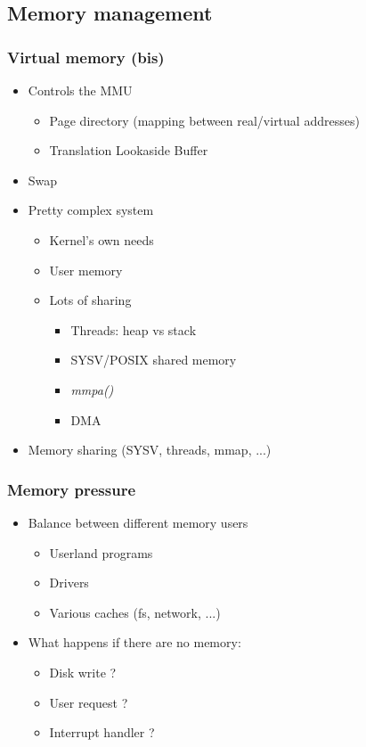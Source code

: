 \subsection{Memory management}
\label{subsec:memory}


\begin{frame}
  \frametitle{Virtual memory (bis)}

  \begin{itemize}
  \item Controls the MMU
    \begin{itemize}
    \item Page directory (mapping between real/virtual addresses)
    \item Translation Lookaside Buffer
    \end{itemize}
  \item Swap
  \item Pretty complex system
    \begin{itemize}
    \item Kernel's own needs
    \item User memory
    \item Lots of sharing
      \begin{itemize}
      \item Threads: heap vs stack
      \item SYSV/POSIX shared memory
      \item \emph{mmpa()}
      \item DMA
      \end{itemize}
    \end{itemize}
  \item Memory sharing (SYSV, threads, mmap, ...)
  \end{itemize}
\end{frame}


\begin{frame}
  \frametitle{Memory pressure}

  \begin{itemize}
  \item Balance between different memory users
    \begin{itemize}
    \item Userland programs
    \item Drivers
    \item Various caches (fs, network, ...)
    \end{itemize}
  \item What happens if there are no memory:
    \begin{itemize}
    \item Disk write ?
    \item User request ?
    \item Interrupt handler ?
    \end{itemize}
  \end{itemize}
\end{frame}


